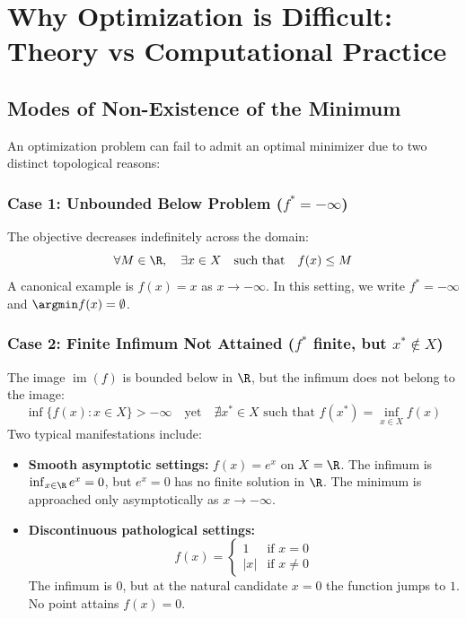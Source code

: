 \FloatBarrier
\section{Why Optimization is Difficult: Theory vs Computational Practice}
\label{sec:opt-difficulty-theory-practice}

\subsection{Modes of Non-Existence of the Minimum}
An optimization problem can fail to admit an optimal minimizer due to two distinct topological reasons:

\subsubsection{Case 1: Unbounded Below Problem ($f^* = -\infty$)}
The objective decreases indefinitely across the domain:
\begin{equation}
\forall M \in \R, \quad \exists x \in X \quad \text{such that} \quad f(x) \le M
\end{equation}
A canonical example is $f(x) = x$ as $x \to -\infty$. In this setting, we write $f^* = -\infty$ and $\argmin f(x) = \emptyset$.

\subsubsection{Case 2: Finite Infimum Not Attained ($f^*$ finite, but $x^* \notin X$)}
The image $\operatorname{im}(f)$ is bounded below in $\R$, but the infimum does not belong to the image:
\begin{equation}
\inf \{ f(x) : x \in X \} > -\infty \quad \text{yet} \quad \nexists x^* \in X \text{ such that } f(x^*) = \inf_{x \in X} f(x)
\end{equation}
Two typical manifestations include:
\begin{itemize}
    \item \textbf{Smooth asymptotic settings:} $f(x) = e^x$ on $X = \R$. The infimum is $\inf_{x \in \R} e^x = 0$, but $e^x = 0$ has no finite solution in $\R$. The minimum is approached only asymptotically as $x \to -\infty$.
    \item \textbf{Discontinuous pathological settings:}
    \begin{equation}
    f(x) = \begin{cases} 1 & \text{if } x = 0 \\ |x| & \text{if } x \neq 0 \end{cases}
    \end{equation}
    The infimum is $0$, but at the natural candidate $x = 0$ the function jumps to $1$. No point attains $f(x) = 0$.
\end{itemize}

